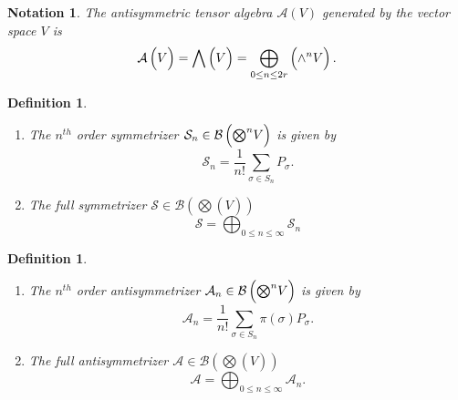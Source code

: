 \documentclass[aps,preprint]{revtex4}%
\newtheorem{definition}[theorem]{Definition}
\newtheorem{notation}[theorem]{Notation}
\begin{document}
\begin{notation}
The \emph{antisymmetric tensor algebra} $\mathcal{A}\left(  V\right)  $
generated by the vector space $V$ is
\begin{equation}
\mathcal{A}\left(  \overset{}{V}\right)  =\bigwedge\left(  \overset{}{V}%
\right)  =\bigoplus\limits_{0\leq n\leq2r}\left(  \overset{}{{\Huge \wedge
}^{n}V}\right)  .
\end{equation}

\end{notation}

\begin{definition}
\begin{enumerate}
\item The $n^{th}$ order symmetrizer $\mathcal{S}_{n}\in\mathcal{B}\left(
\overset{}{%
{\textstyle\bigotimes\nolimits^{n}}
V}\right)  $ is given by
\begin{equation}
\mathcal{S}_{n}=\frac{1}{n!}\sum_{\sigma\in S_{n}}P_{\sigma}.
\end{equation}


\item The full symmetrizer $\mathcal{S}\in\mathcal{B}\left(  \bigotimes\left(
\overset{}{V}\right)  \right)  $
\begin{equation}
\mathcal{S}=%
{\textstyle\bigoplus_{0\leq n\leq\infty}}
\mathcal{S}_{n}%
\end{equation}

\end{enumerate}
\end{definition}

\begin{definition}
\begin{enumerate}
\item The $n^{th}$ order antisymmetrizer $\mathcal{A}_{n}\in\mathcal{B}\left(
\overset{}{%
{\textstyle\bigotimes\nolimits^{n}}
V}\right)  $ is given by
\begin{equation}
\mathcal{A}_{n}=\frac{1}{n!}\sum_{\sigma\in S_{n}}\pi\left(  \sigma\right)
P_{\sigma}.
\end{equation}


\item The full antisymmetrizer $\mathcal{A}\in\mathcal{B}\left(
\bigotimes\left(  \overset{}{V}\right)  \right)  $
\begin{equation}
\mathcal{A}=%
{\textstyle\bigoplus_{0\leq n\leq\infty}}
\mathcal{A}_{n}.
\end{equation}

\end{enumerate}
\end{definition}
\end{document}
